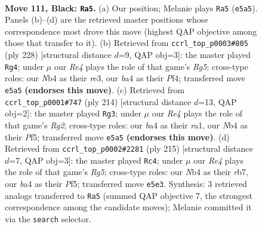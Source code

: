 \documentclass[11pt]{article}
\begin{document}
\clearpage

\begin{figure}[p]\centering
\begin{subfigure}{0.46\textwidth}\centering
\resizebox{\linewidth}{!}{%
\newchessgame
\chessboard[
  setfen={8/8/8/4rkp1/Bn6/6K1/8/8 b - - 7 111},
  showmover=false,
  pgfstyle=straightmove, color=movearrow, markmove={e5-a5}
]}
\caption{}
\end{subfigure}\hfill
\begin{subfigure}{0.46\textwidth}\centering
\resizebox{\linewidth}{!}{%
\newchessgame
\chessboard[
  setfen={5k2/8/5PK1/6R1/5P2/4r3/8/8 w - - 73 115},
  showmover=false,
  pgfstyle=straightmove, color=movearrow, markmove={g5-g4}
]}
\caption{}
\end{subfigure}
\\[4pt]
\begin{subfigure}{0.46\textwidth}\centering
\resizebox{\linewidth}{!}{%
\newchessgame
\chessboard[
  setfen={8/7k/7P/5PK1/8/8/6R1/r7 w - - 67 108},
  showmover=false,
  pgfstyle=straightmove, color=movearrow, markmove={g2-g3}
]}
\caption{}
\end{subfigure}\hfill
\begin{subfigure}{0.46\textwidth}\centering
\resizebox{\linewidth}{!}{%
\newchessgame
\chessboard[
  setfen={8/1R6/8/5p2/6r1/5pk1/8/5K2 b - - 13 108},
  showmover=false,
  pgfstyle=straightmove, color=movearrow, markmove={g4-c4}
]}
\caption{}
\end{subfigure}
\caption{\textbf{Move 111, Black: \texttt{Ra5}.} (a) Our position; Melanie plays \texttt{Ra5} (\texttt{e5a5}). Panels (b)--(d) are the retrieved master positions whose correspondence most drove this move (highest QAP objective among those that transfer to it). (b) Retrieved from \texttt{ccrl\_top\_p0003\#805} (ply 228) [structural distance $d$=9, QAP obj=3]: the master played \texttt{Rg4}; under $\mu$ our \emph{Re4} plays the role of that game's \emph{Rg5}; cross-type roles: our \emph{N}b4 as their \emph{r}e3, our \emph{b}a4 as their \emph{P}f4; transferred move \texttt{e5a5} \textbf{(endorses this move)}. (c) Retrieved from \texttt{ccrl\_top\_p0001\#747} (ply 214) [structural distance $d$=13, QAP obj=2]: the master played \texttt{Rg3}; under $\mu$ our \emph{Re4} plays the role of that game's \emph{Rg2}; cross-type roles: our \emph{b}a4 as their \emph{r}a1, our \emph{N}b4 as their \emph{P}f5; transferred move \texttt{e5a5} \textbf{(endorses this move)}. (d) Retrieved from \texttt{ccrl\_top\_p0002\#2281} (ply 215) [structural distance $d$=7, QAP obj=3]: the master played \texttt{Rc4}; under $\mu$ our \emph{Re4} plays the role of that game's \emph{Rg5}; cross-type roles: our \emph{N}b4 as their \emph{r}b7, our \emph{b}a4 as their \emph{P}f5; transferred move \texttt{e5e3}. Synthesis: 3 retrieved analogs transferred to \texttt{Ra5} (summed QAP objective 7, the strongest correspondence among the candidate moves); Melanie committed it via the \texttt{search} selector.}
\label{fig:thought-m221}
\end{figure}
\end{document}
